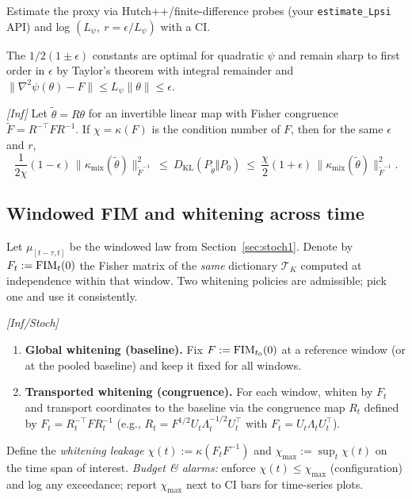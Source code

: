 \begin{remark}[Estimator]\label{rem:Lpsi-est}
Estimate the proxy via Hutch++/finite-difference probes (your \texttt{estimate\_Lpsi} API) and log $(L_\psi,\ r=\epsilon/L_\psi)$ with a CI. 
\end{remark}

\begin{remark}\label{rem:constants}
The $1/2(1\pm\epsilon)$ constants are optimal for quadratic $\psi$ and remain sharp to first order in $\epsilon$ by Taylor's theorem with integral remainder and $\|\nabla^2\psi(\theta)-F\|\le L_\psi\|\theta\|\le\epsilon$.
\end{remark}

\begin{corollary}\label{cor:FIM-conditioning}
\emph{[\textup{Inf}]} Let $\tilde \theta=R\theta$ for an invertible linear map with Fisher congruence $\tilde F=R^{-\top} F R^{-1}$. If $\chi=\kappa(F)$ is the condition number of $F$, then for the same $\epsilon$ and $r$,
\[
\frac1{2\chi}(1-\epsilon)\,\|\kappa_{\mathrm{mix}}(\tilde\theta)\|_{\tilde F^{-1}}^{2}
\ \le\ D_{\mathrm{KL}}(P_{\tilde\theta}\Vert P_0)\
\le\ \frac{\chi}{2}(1+\epsilon)\,\|\kappa_{\mathrm{mix}}(\tilde\theta)\|_{\tilde F^{-1}}^{2}.
\]
\end{corollary}

\subsection{Windowed FIM and whitening across time}\label{subsec:window-fim}

Let $\mu_{[t-\tau,t]}$ be the windowed law from Section~\ref{sec:stoch1}. Denote by $F_t:=\mathrm{FIM}_t(0)$ the Fisher matrix of the \emph{same} dictionary $\mathcal T_K$ computed at independence within that window. Two whitening policies are admissible; pick one and use it consistently.

\begin{definition}[Whitening policies]\label{def:whitening-policies}
\emph{[\textup{Inf/Stoch}]}
\begin{enumerate}[leftmargin=*]
\item \textbf{Global whitening (baseline).} Fix $F:=\mathrm{FIM}_{t_0}(0)$ at a reference window (or at the pooled baseline) and keep it fixed for all windows.
\item \textbf{Transported whitening (congruence).} For each window, whiten by $F_t$ and transport coordinates to the baseline via the congruence map $R_t$ defined by $F_t=R_t^{-\top} F R_t^{-1}$ (e.g., $R_t=F^{1/2}U_t\Lambda_t^{-1/2}U_t^\top$ with $F_t=U_t\Lambda_t U_t^\top$).
\end{enumerate}
Define the \emph{whitening leakage} $\chi(t):=\kappa(F_t F^{-1})$ and $\chi_{\max}:=\sup_t \chi(t)$ on the time span of interest.
\emph{Budget \& alarms:} enforce $\chi(t)\le \chi_{\max}$ (configuration) and log any exceedance; report $\chi_{\max}$ next to CI bars for time-series plots.

\end{definition}

